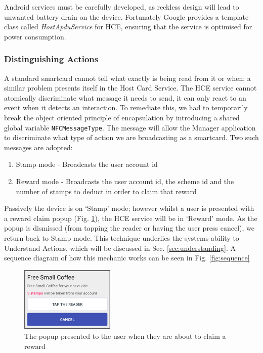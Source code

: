 Android services must be carefully developed, as reckless design will lead to unwanted battery drain on the device. Fortunately Google provides a template class called \emph{HostApduService} for HCE, ensuring that the service is optimised for power consumption. 

\subsubsection{Distinguishing Actions}
A standard smartcard cannot tell what exactly is being read from it or when; a similar problem presents itself in the Host Card Service. The HCE service cannot atomically discriminate what message it needs to send, it can only react to an event when it detects an interaction. To remediate this, we had to temporarily break the object oriented principle of encapsulation by introducing a shared global variable \texttt{NFCMessageType}. The message will allow the Manager application to discriminate what type of action we are broadcasting as a smartcard. Two such messages are adopted:
\begin{enumerate}
 \item Stamp mode - Broadcasts the user account id
  \item Reward mode - Broadcasts the user account id, the scheme id and the number of stamps to deduct in order to claim that reward
\end{enumerate}
Passively the device is on `Stamp' mode; however whilst a user is presented with a reward claim popup (Fig. \ref{fig:claimreward}), the HCE service will be in `Reward' mode. As the popup is dismissed (from tapping the reader or having the user press cancel), we return back to Stamp mode. This technique underlies the systems ability to Understand Actions, which will be discussed in Sec. \ref{sec:understanding}. A sequence diagram of how this mechanic works can be seen in Fig. \ref{fig:sequence}

\begin{figure}[H]
 \centering
  \includegraphics[width=0.40\textwidth]{img/claimreward.png}
     \caption{The popup presented to the user when they are about to claim a reward}
     \label{fig:claimreward}
\end{figure}

